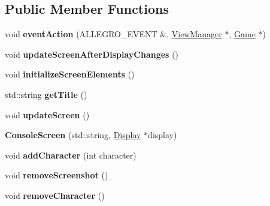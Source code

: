 \subsection*{Public Member Functions}
\begin{DoxyCompactItemize}
\item 
void {\bfseries event\+Action} (A\+L\+L\+E\+G\+R\+O\+\_\+\+E\+V\+E\+NT \&, \hyperlink{classViewManager}{View\+Manager} $\ast$, \hyperlink{classGame}{Game} $\ast$)\hypertarget{classConsoleScreen_a6db8562435775c00363479c303d884a5}{}\label{classConsoleScreen_a6db8562435775c00363479c303d884a5}

\item 
void {\bfseries update\+Screen\+After\+Display\+Changes} ()\hypertarget{classConsoleScreen_a512a1401ec957d5d2d504aafd315362d}{}\label{classConsoleScreen_a512a1401ec957d5d2d504aafd315362d}

\item 
void {\bfseries initialize\+Screen\+Elements} ()\hypertarget{classConsoleScreen_a632e8a9ebefb9574537d5268e6ae805f}{}\label{classConsoleScreen_a632e8a9ebefb9574537d5268e6ae805f}

\item 
std\+::string {\bfseries get\+Title} ()\hypertarget{classConsoleScreen_a826d101fdea392e61d6d4f5b1087a33f}{}\label{classConsoleScreen_a826d101fdea392e61d6d4f5b1087a33f}

\item 
void {\bfseries update\+Screen} ()\hypertarget{classConsoleScreen_a0439f4f690a398f43952a6dffb7b2b20}{}\label{classConsoleScreen_a0439f4f690a398f43952a6dffb7b2b20}

\item 
{\bfseries Console\+Screen} (std\+::string, \hyperlink{classDisplay}{Display} $\ast$display)\hypertarget{classConsoleScreen_a01b953aaa725a0b844d530b0f6d042bf}{}\label{classConsoleScreen_a01b953aaa725a0b844d530b0f6d042bf}

\item 
void {\bfseries add\+Character} (int character)\hypertarget{classConsoleScreen_a53358e8bf5f4dbacd719e993644335c8}{}\label{classConsoleScreen_a53358e8bf5f4dbacd719e993644335c8}

\item 
void {\bfseries remove\+Screenshot} ()\hypertarget{classConsoleScreen_afc261c0c2a8945de896c46e314f8988c}{}\label{classConsoleScreen_afc261c0c2a8945de896c46e314f8988c}

\item 
void {\bfseries remove\+Character} ()\hypertarget{classConsoleScreen_a3030f2a5ba1a99cf3c1bcdd1db06b943}{}\label{classConsoleScreen_a3030f2a5ba1a99cf3c1bcdd1db06b943}


\end{DoxyCompactItemize}

